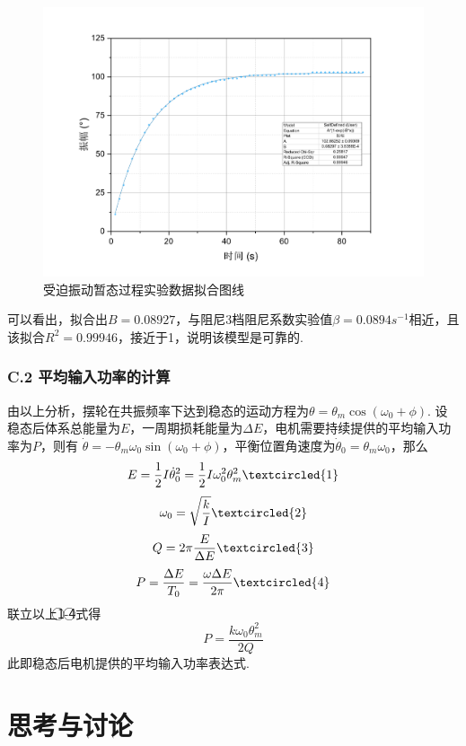 \documentclass[UTF8]{ctexart}
\begin{document}
\begin{figure}[H]\begin{center}
\includegraphics[scale=0.4]{transient_ideal.pdf}\vspace{-5mm}
\caption{受迫振动暂态过程实验数据拟合图线}
\end{center}\end{figure}
可以看出，拟合出$B=0.08927$，与阻尼3档阻尼系数实验值$\beta=0.0894s^{-1}$相近，且该拟合$R^2=0.99946$，接近于1，说明该模型是可靠的.
\subsubsection*{C.2 平均输入功率的计算}
由以上分析，摆轮在共振频率下达到稳态的运动方程为$\theta=\theta_m\cos(\omega_0+\phi)$. 设稳态后体系总能量为$E$，一周期损耗能量为$\Delta E$，电机需要持续提供的平均输入功率为$P$，则有
$\dot{\theta}=-\theta_m\omega_0\sin(\omega_0+\phi)$，平衡位置角速度为$\dot{\theta}_0=\theta_m\omega_0$，那么\\
\[E=\frac{1}{2}I\dot{\theta}_0^2=\frac{1}{2}I\omega_0^2\theta_m^2\textcircled{1}\]
\[\omega_0=\sqrt{\frac{k}{I}}\textcircled{2}\]
\[Q=2\pi\frac{E}{\Delta E}\textcircled{3}\]
\[P=\frac{\Delta E}{T_0}=\frac{\omega\Delta E}{2\pi}\textcircled{4}\]
联立以上\textcircled{1}-\textcircled{4}式得
\begin{equation}
P=\frac{k\omega_0\theta_m^2}{2Q}
\end{equation}
此即稳态后电机提供的平均输入功率表达式.
\section{思考与讨论}
\end{document}
